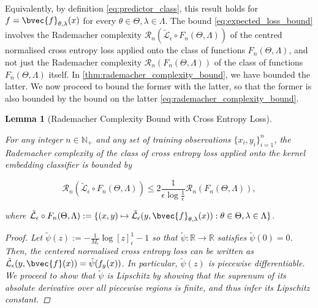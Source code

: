 \documentclass{article}
\newtheorem{lemma}[theorem]{Lemma}
\begin{document}
		Equivalently, by definition \eqref{eq:predictor_class}, this result holds for $f = \bvec{f}_{\theta, \lambda}(x)$ for every $\theta \in \Theta, \lambda \in \Lambda$. The bound \eqref{eq:expected_loss_bound} involves the Rademacher complexity $\mathcal{R}_{n}(\tilde{\mathcal{L}}_{\epsilon} \circ F_{n}(\Theta, \Lambda))$ of the centred normalised cross entropy loss applied onto the class of functions $F_{n}(\Theta, \Lambda)$, and not just the Rademacher complexity $\mathcal{R}_{n}(F_{n}(\Theta, \Lambda))$ of the class of functions $F_{n}(\Theta, \Lambda)$ itself. In \cref{thm:rademacher_complexity_bound}, we have bounded the latter. We now proceed to bound the former with the latter, so that the former is also bounded by the bound on the latter \eqref{eq:rademacher_complexity_bound}.
		
		\begin{lemma}[Rademacher Complexity Bound with Cross Entropy Loss]
		\label{thm:rademacher_complexity_bound_with_cross_entropy_loss}
		
			For any integer $n \in \mathbb{N}_{+}$ and any set of training observations $\{x_{i}, y_{i}\}_{i = 1}^{n}$, the Rademacher complexity of the class of cross entropy loss applied onto the kernel embedding classifier is bounded by
			
			\begin{equation}
				\mathcal{R}_{n}(\tilde{\mathcal{L}}_{\epsilon} \circ F_{n}(\Theta, \Lambda)) \leq 2 \frac{1}{\epsilon \log{\frac{1}{\epsilon}}} \mathcal{R}_{n}(F_{n}(\Theta, \Lambda)),
			\label{eq:composed_rademacher_complexity_bound}
			\end{equation}
			
			where $\tilde{\mathcal{L}}_{\epsilon} \circ F_{n}(\Theta, \Lambda) := \{(x, y) \mapsto \tilde{\mathcal{L}}_{\epsilon}(y, \bvec{f}_{\theta, \lambda}(x)) : \theta \in \Theta, \lambda \in \Lambda\}$.
			
			\begin{proof}
				Let $\tilde{\psi}(z) := - \frac{1}{M_{\epsilon}} \log{[z]_{\epsilon}^{1}} - 1$ so that $\tilde{\psi} : \mathbb{R} \to \mathbb{R}$ satisfies $\tilde{\psi}(0) = 0$. Then, the centered normalised cross entropy loss can be written as $\tilde{\mathcal{L}}_{\epsilon}(y, \bvec{f}(x)) = \tilde{\psi}(f_{y}(x))$. In particular, $\tilde{\psi}(z)$ is piecewise differentiable. We proceed to show that $\tilde{\psi}$ is Lipschitz by showing that the suprenum of its absolute derivative over all piecewise regions is finite, and thus infer its Lipschitz constant.
				

\end{proof}
\end{lemma}
\end{document}
